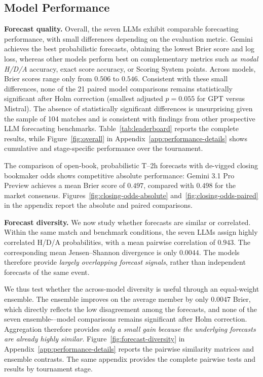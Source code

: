 \documentclass[sigconf,nonacm]{acmart}
\begin{document}
\subsection{Model Performance}
\textbf{Forecast quality.}
Overall, the seven LLMs exhibit comparable forecasting performance, with small differences depending on the evaluation metric. Gemini achieves the best probabilistic forecasts, obtaining the lowest Brier score and log loss, whereas other models perform best on complementary metrics such as \emph{modal H/D/A} accuracy, exact score accuracy, or Scoring System points. Across models, Brier scores range only from $0.506$ to $0.546$. Consistent with these small differences, none of the 21 paired model comparisons remains statistically significant after Holm correction (smallest adjusted $p=0.055$ for GPT versus Mistral). The absence of statistically significant differences is unsurprising given the sample of 104 matches and is consistent with findings from other prospective LLM forecasting benchmarks. 
Table~\ref{tab:leaderboard} reports the complete results, while Figure~\ref{fig:overall} in Appendix~\ref{app:performance-details} shows cumulative and stage-specific performance over the tournament.

The comparison of open-book, probabilistic T--2h forecasts with de-vigged closing bookmaker odds
shows competitive absolute performance: Gemini 3.1 Pro Preview achieves a mean Brier score of $0.497$, compared with $0.498$ for the market consensus. Figures~\ref{fig:closing-odds-absolute} and~\ref{fig:closing-odds-paired} in the appendix report the absolute and paired comparisons.

\textbf{Forecast diversity.}
We now study whether forecasts are similar or correlated. Within the same match and benchmark conditions, the seven LLMs assign highly correlated H/D/A probabilities, with a mean pairwise correlation of $0.943$. The corresponding mean Jensen--Shannon divergence is only $0.0044$. The models therefore provide \emph{largely overlapping forecast signals}, rather than independent forecasts of the same event.

We thus test whether the across-model diversity is useful through an equal-weight ensemble. The ensemble improves on the average member by only $0.0047$ Brier, which directly reflects the low disagreement among the forecasts, and none of the seven ensemble-–model comparisons remains significant after Holm correction. Aggregation therefore provides \emph{only a small gain because the underlying forecasts are already highly similar}. Figure~\ref{fig:forecast-diversity} in Appendix~\ref{app:performance-details} reports the pairwise similarity matrices and ensemble contrasts. The same appendix provides the complete pairwise tests and results by tournament stage.
\end{document}
